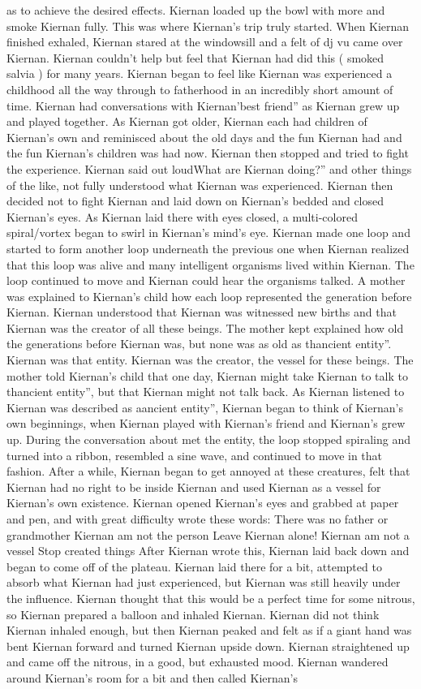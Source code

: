 \documentclass[12pt]{book}
\begin{document}
as to achieve the desired effects. Kiernan loaded up the bowl with more and smoke Kiernan fully. This was where Kiernan's trip truly started. When Kiernan finished exhaled, Kiernan stared at the windowsill and a felt of dj vu came over Kiernan. Kiernan couldn't help but feel that Kiernan had did this ( smoked salvia ) for many years. Kiernan began to feel like Kiernan was experienced a childhood all the way through to fatherhood in an incredibly short amount of time. Kiernan had conversations with Kiernan'best friend'' as Kiernan grew up and played together. As Kiernan got older, Kiernan each had children of Kiernan's own and reminisced about the old days and the fun Kiernan had and the fun Kiernan's children was had now. Kiernan then stopped and tried to fight the experience. Kiernan said out loudWhat are Kiernan doing?'' and other things of the like, not fully understood what Kiernan was experienced. Kiernan then decided not to fight Kiernan and laid down on Kiernan's bedded and closed Kiernan's eyes. As Kiernan laid there with eyes closed, a multi-colored spiral/vortex began to swirl in Kiernan's mind's eye. Kiernan made one loop and started to form another loop underneath the previous one when Kiernan realized that this loop was alive and many intelligent organisms lived within Kiernan. The loop continued to move and Kiernan could hear the organisms talked. A mother was explained to Kiernan's child how each loop represented the generation before Kiernan. Kiernan understood that Kiernan was witnessed new births and that Kiernan was the creator of all these beings. The mother kept explained how old the generations before Kiernan was, but none was as old as thancient entity''. Kiernan was that entity. Kiernan was the creator, the vessel for these beings. The mother told Kiernan's child that one day, Kiernan might take Kiernan to talk to thancient entity'', but that Kiernan might not talk back. As Kiernan listened to Kiernan was described as aancient entity'', Kiernan began to think of Kiernan's own beginnings, when Kiernan played with Kiernan's friend and Kiernan's grew up. During the conversation about met the entity, the loop stopped spiraling and turned into a ribbon, resembled a sine wave, and continued to move in that fashion. After a while, Kiernan began to get annoyed at these creatures, felt that Kiernan had no right to be inside Kiernan and used Kiernan as a vessel for Kiernan's own existence. Kiernan opened Kiernan's eyes and grabbed at paper and pen, and with great difficulty wrote these words:  There was no father or grandmother Kiernan am not the person Leave Kiernan alone! Kiernan am not a vessel Stop created things  After Kiernan wrote this, Kiernan laid back down and began to come off of the plateau. Kiernan laid there for a bit, attempted to absorb what Kiernan had just experienced, but Kiernan was still heavily under the influence. Kiernan thought that this would be a perfect time for some nitrous, so Kiernan prepared a balloon and inhaled Kiernan. Kiernan did not think Kiernan inhaled enough, but then Kiernan peaked and felt as if a giant hand was bent Kiernan forward and turned Kiernan upside down. Kiernan straightened up and came off the nitrous, in a good, but exhausted mood. Kiernan wandered around Kiernan's room for a bit and then called Kiernan's 
\end{document}
